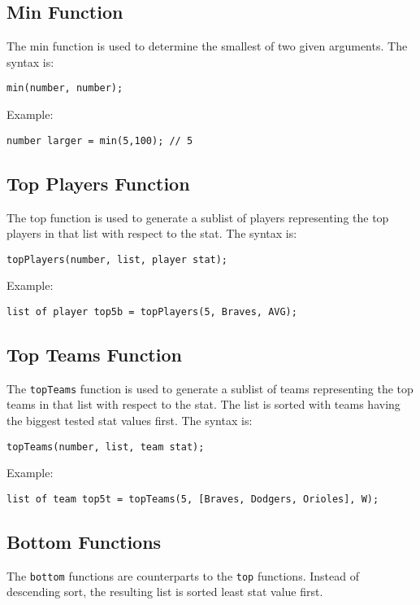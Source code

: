 \subsection{Min Function}
The min function is used to determine the smallest of two given arguments. The syntax is:

\begin{verbatim}
min(number, number);
\end{verbatim}
Example: 
\begin{verbatim}
number larger = min(5,100); // 5
\end{verbatim}

\subsection{Top Players Function}
The top function is used to generate a sublist of players representing
the top players in that list with respect to the stat. The syntax is:

\begin{verbatim}
topPlayers(number, list, player stat);
\end{verbatim}
Example: 
\begin{verbatim}
list of player top5b = topPlayers(5, Braves, AVG);
\end{verbatim}

\subsection{Top Teams Function}
The \texttt{topTeams} function is used to generate a sublist of teams
representing the top teams in that list with respect to the stat. The
list is sorted with teams having the biggest tested stat values
first. The syntax is:

\begin{verbatim}
topTeams(number, list, team stat);
\end{verbatim}
Example: 
\begin{verbatim}
list of team top5t = topTeams(5, [Braves, Dodgers, Orioles], W);
\end{verbatim}

\subsection{Bottom Functions}
The \texttt{bottom} functions are counterparts to the \texttt{top}
functions. Instead of descending sort, the resulting list is sorted
least stat value first.


